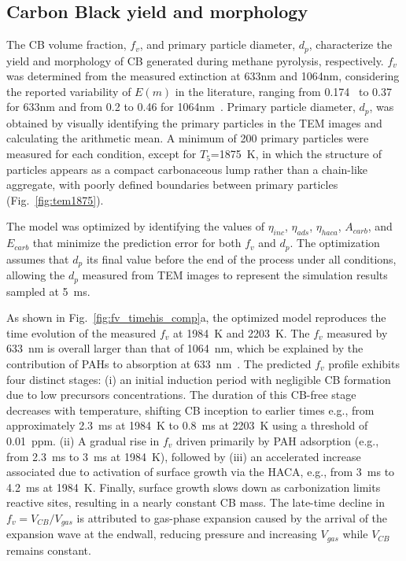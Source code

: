 \subsection{Carbon Black yield and morphology}
The CB volume fraction, $f_v$, and primary particle diameter, $d_p$, characterize the yield and morphology of CB generated during methane pyrolysis, respectively. $f_v$ was determined from the measured extinction at 633nm and 1064nm, considering the reported variability of $E(m)$ in the literature, ranging from 0.174~\citep{lee1981optical} to 0.37~\citep{agafonov2011soot} for 633nm and from 0.2 to 0.46 for 1064nm~\cite{bladh2011optical}. Primary particle diameter, $d_p$, was obtained by visually identifying the primary particles in the TEM images and calculating the arithmetic mean. A minimum of 200 primary particles were measured for each condition, except for $T_5$=1875~K, in which the structure of particles appears as a compact carbonaceous lump rather than a chain-like aggregate, with poorly defined boundaries between primary particles (Fig.~\ref{fig:tem1875}).

The model was optimized by identifying the values of $\eta_{inc}$, $\eta_{ads}$, $\eta_{haca}$, $A_{carb}$, and $E_{carb}$ that minimize the prediction error for both $f_v$ and $d_p$. The optimization assumes that $d_p$  its final value before the end of the process under all conditions, allowing the $d_p$ measured from TEM images to represent the simulation results sampled at 5~ms.


As shown in Fig.~\ref{fig:fv_timehis_comp}a, the optimized model reproduces the time evolution of the measured $f_v$ at 1984~K and 2203~K. The $f_v$ measured by 633~nm is overall larger than that of 1064~nm, which be explained by the contribution of PAHs to absorption at 633~nm~\citep{zerbs2009influence}. The predicted $f_v$ profile exhibits four distinct stages: (i) an initial induction period with negligible CB formation due to low precursors concentrations. The duration of this CB-free stage decreases with temperature, shifting CB inception to earlier times e.g., from approximately 2.3~ms at 1984~K to 0.8~ms at 2203~K using a threshold of 0.01~ppm. (ii) A gradual rise in $f_v$ driven primarily by PAH adsorption (e.g., from 2.3~ms to 3~ms at 1984~K), followed by (iii) an accelerated increase associated due to activation of surface growth via the HACA, e.g., from 3~ms to 4.2~ms at 1984~K. Finally, surface growth slows down as carbonization limits reactive sites, resulting in a nearly constant CB mass. The late-time decline in $f_v = V_{CB}/V_{gas}$ is attributed to gas-phase expansion caused by the arrival of the expansion wave at the endwall, reducing pressure and increasing $V_{gas}$ while $V_{CB}$ remains constant.

